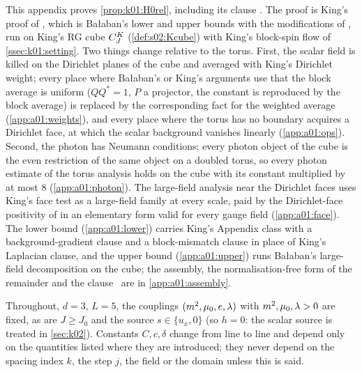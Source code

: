 This appendix proves \cref{prop:k01:H0rel}, including its clause \Rzero. The proof is King's proof of \cite[Thm.~3.1]{K1}, which is Ba{\l}aban's lower and upper bounds \cite{Ba1,Ba2} with the modifications of \cite[Appendix]{K1}, run on King's RG cube $C^{K}_{J}$ (\cref{def:s02:Kcube}) with King's block-spin flow of \cref{ssec:k01:setting}. Two things change relative to the torus. First, the scalar field is killed on the Dirichlet planes of the cube and averaged with King's Dirichlet weight; every place where Ba{\l}aban's or King's arguments use that the block average is uniform ($QQ^*=1$, $P$ a projector, the constant is reproduced by the block average) is replaced by the corresponding fact for the weighted average (\cref{app:a01:weights}), and every place where the torus has no boundary acquires a Dirichlet face, at which the scalar background vanishes linearly (\cref{app:a01:ops}). Second, the photon has Neumann conditions; every photon object of the cube is the even restriction of the same object on a doubled torus, so every photon estimate of the torus analysis holds on the cube with its constant multiplied by at most $8$ (\cref{app:a01:photon}). The large-field analysis near the Dirichlet faces uses King's face test \cite[(5.41)]{K2} as a large-field family at every scale, paid by the Dirichlet-face positivity of \cite[Prop.~5.4]{K2} in an elementary form valid for every gauge field (\cref{app:a01:face}). The lower bound (\cref{app:a01:lower}) carries King's Appendix class with a background-gradient clause and a block-mismatch clause in place of King's Laplacian clause, and the upper bound (\cref{app:a01:upper}) runs Ba{\l}aban's large-field decomposition on the cube; the assembly, the normalisation-free form of the remainder and the clause \Rzero\ are in \cref{app:a01:assembly}.

Throughout, $d=3$, $L=5$, the couplings $(m^2,\mu_0,e,\lambda)$ with $m^2,\mu_0,\lambda>0$ are fixed, as are $J\ge J_0$ and the source $s\in\{u_x,0\}$ (so $h=0$: the scalar source is treated in \cref{sec:k02}). Constants $C,c,\delta$ change from line to line and depend only on the quantities listed where they are introduced; they never depend on the spacing index $k$, the step $j$, the field or the domain unless this is said.










